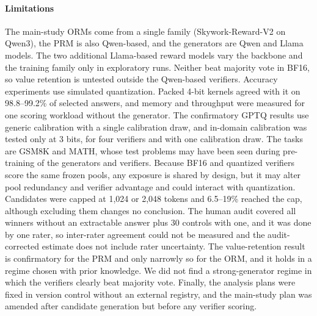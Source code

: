 \paragraph{Limitations} The main-study ORMs come from a single family
(Skywork-Reward-V2 on Qwen3), the PRM is also Qwen-based, and the generators are Qwen and
Llama models. The two additional Llama-based reward models vary the backbone and the
training family only in exploratory runs. Neither beat majority vote in BF16, so value
retention is untested outside the Qwen-based verifiers. Accuracy experiments use
simulated quantization. Packed 4-bit kernels agreed with it on 98.8--99.2\% of selected
answers, and memory and throughput were measured for one scoring workload without the
generator. The confirmatory GPTQ results use generic calibration with a single
calibration draw, and in-domain calibration was tested only at 3 bits, for four
verifiers and with one calibration draw. The tasks are GSM8K and MATH, whose test problems may have been seen during
pre-training of the generators and verifiers. Because BF16 and quantized verifiers
score the same frozen pools, any exposure is shared by design, but it may alter pool
redundancy and verifier advantage and could interact with quantization. Candidates were
capped at 1,024 or 2,048 tokens and 6.5--19\% reached the cap, although excluding them
changes no conclusion. The human audit covered all winners without an extractable answer plus 30 controls
with one, and it was done by one rater, so inter-rater agreement could not be measured
and the audit-corrected estimate does not include rater uncertainty. The value-retention result is confirmatory for the PRM and only
narrowly so for the ORM, and it holds in a regime chosen with prior knowledge. We did
not find a strong-generator regime in which the verifiers clearly beat majority vote.
Finally, the analysis plans were fixed in version control without an external registry,
and the main-study plan was amended after candidate generation but before any verifier
scoring.
